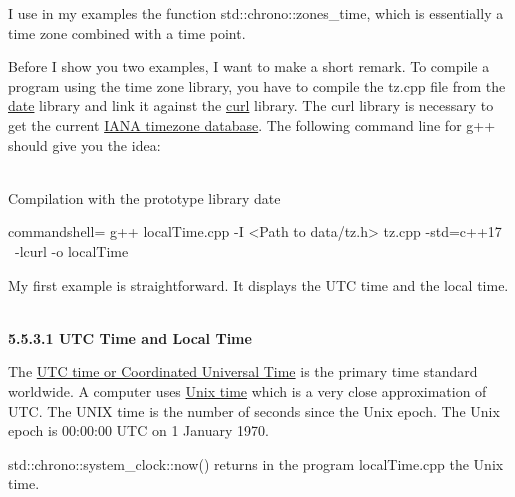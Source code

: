 I use in my examples the function std::chrono::zones\_time, which is essentially a time zone combined with a time point.

\begin{tcolorbox}[colback=blue!5!white,colframe=blue!75!black,title={Compilation of the examples}]
	
Before I show you two examples, I want to make a short remark. To compile a program using the time zone library, you have to compile the tz.cpp file from the \href{https://github.com/HowardHinnant/date}{date} library and link it against the \href{https://curl.se/}{curl} library. The curl library is necessary to get the current \href{https://www.iana.org/timezones}{IANA timezone database}. The following command line for g++ should give you the idea:

\hspace*{\fill} \\ %
\noindent
Compilation with the prototype library date
\begin{tcblisting}{commandshell={}}
g++ localTime.cpp -I <Path to data/tz.h> tz.cpp -std=c++17 \
  -lcurl -o localTime
\end{tcblisting}

\end{tcolorbox}

My first example is straightforward. It displays the UTC time and the local time.

\hspace*{\fill} \\ %
\noindent
\textbf{5.5.3.1\hspace{0.2cm} UTC Time and Local Time}

The \href{https://en.wikipedia.org/wiki/Coordinated_Universal_Time}{UTC time or Coordinated Universal Time} is the primary time standard worldwide. A computer uses \href{https://en.wikipedia.org/wiki/Unix_time}{Unix time} which is a very close approximation of UTC. The UNIX time is the number of seconds since the Unix epoch. The Unix epoch is 00:00:00 UTC on 1 January 1970.

std::chrono::system\_clock::now() returns in the program localTime.cpp the Unix time.

